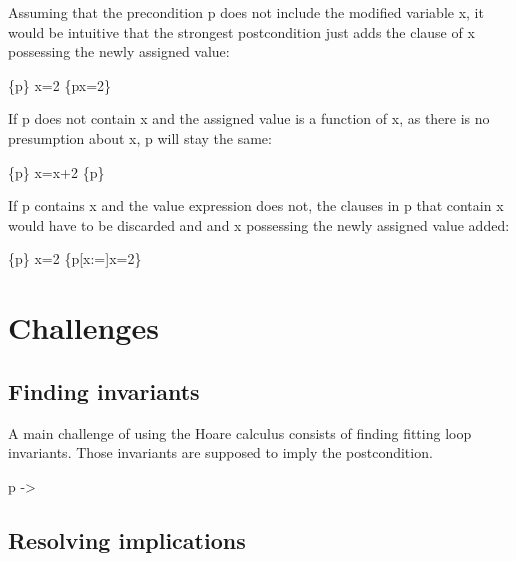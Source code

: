 Assuming that the precondition p does not include the modified variable x, it would be intuitive that the strongest postcondition just adds the clause of x possessing the newly assigned value:
\begin{hoare}
\{p\} x=2 \{p\wedge x=2\}
\end{hoare}

If p does not contain x and the assigned value is a function of x, as there is no presumption about x, p will stay the same:
\begin{hoare}
\{p\} x=x+2 \{p\}
\end{hoare}

If p contains x and the value expression does not, the clauses in p that contain x would have to be discarded and and x possessing the newly assigned value added:
\begin{hoare}
\{p\} x=2 \{p[x:=]\wedge x=2\}
\end{hoare}

\section{Challenges}\label{sec:challenges}
\subsection{Finding invariants}

A main challenge of using the Hoare calculus consists of finding fitting loop invariants. Those invariants are supposed to imply the postcondition.

p -> 

\subsection{Resolving implications}


